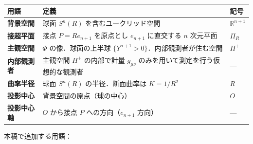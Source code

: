 \documentclass[a4paper,11pt]{ltjsarticle}
\theoremstyle{definition}
\begin{document}
{\def\LTcaptype{table} %
\begin{longtable}[]{@{}
  >{\raggedright\arraybackslash}p{}
  >{\raggedright\arraybackslash}p{}
  >{\raggedright\arraybackslash}p{}@{}}
\toprule\noalign{}
\begin{minipage}[b]{\linewidth}\raggedright
用語
\end{minipage} & \begin{minipage}[b]{\linewidth}\raggedright
定義
\end{minipage} & \begin{minipage}[b]{\linewidth}\raggedright
記号
\end{minipage} \\
\midrule\noalign{}
\endhead
\bottomrule\noalign{}
\endlastfoot
\textbf{背景空間} & 球面 \(S^n(R)\) を含むユークリッド空間 & \(\mathbb{R}^{n+1}\) \\
\textbf{接超平面} & 接点 \(P = Re_{n+1}\) を原点とし \(e_{n+1}\) に直交する \(n\) 次元平面 & \(\Pi_R\) \\
\textbf{主観空間} & \(\Phi\) の像．球面の上半球 \(\{Y^{n+1} > 0\}\)．内部観測者が住む空間 & \(H^+\) \\
\textbf{内部観測者} & 主観空間 \(H^+\) の内部で計量 \(g_{\mu\nu}\) のみを用いて測定を行う仮想的な観測者 & --- \\
\textbf{曲率半径} & 球面 \(S^n(R)\) の半径．断面曲率は \(K = 1/R^2\) & \(R\) \\
\textbf{投影中心} & 背景空間の原点（球の中心） & \(O\) \\
\textbf{投影中心軸} & \(O\) から接点 \(P\) への方向（\(e_{n+1}\) 方向） & --- \\
\end{longtable}
}

本稿で追加する用語：
\end{document}
